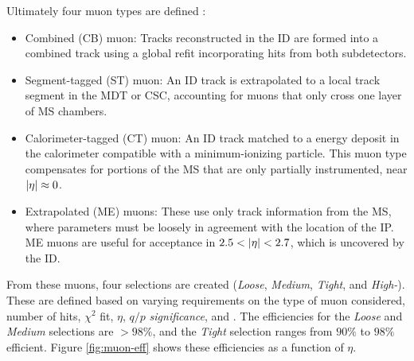 Ultimately four muon types are defined \cite{muon-reco}:
\begin{itemize}
    \item Combined (CB) muon: Tracks reconstructed in the \gls{ID} are formed into a combined track using a global refit incorporating hits from both subdetectors.
    \item Segment-tagged (ST) muon: An \gls{ID} track is extrapolated to a local track segment in the \gls{MDT} or \gls{CSC}, accounting for muons that only cross one layer of \gls{MS} chambers.
    \item Calorimeter-tagged (CT) muon: An \gls{ID} track matched to a energy deposit in the calorimeter compatible with a minimum-ionizing particle. This muon type compensates for portions of the \gls{MS} that are only partially instrumented, near $|\eta| \approx 0$.
    \item Extrapolated (ME) muons: These use only track information from the \gls{MS}, where parameters must be loosely in agreement with the location of the \gls{IP}. ME muons are useful for acceptance in $2.5 < |\eta| < 2.7$, which is uncovered by the \gls{ID}.
\end{itemize}


From these muons, four selections are created (\textit{Loose}, \textit{Medium}, \textit{Tight}, and \textit{High-\pt}). These are defined based on varying requirements on the type of muon considered, number of hits, $\chi^2$ fit, $\eta$, $q/p$ \textit{significance}, and \pt. The efficiencies for the \textit{Loose} and \textit{Medium} selections are $>98\%$, and the \textit{Tight} selection ranges from $90\%$ to $98\%$ efficient. Figure \ref{fig:muon-eff} shows these efficiencies as a function of $\eta$.



